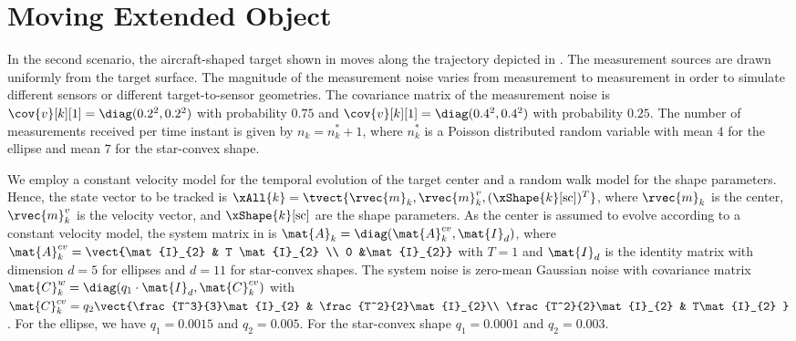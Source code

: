 \documentclass[preprint,1p,11pt]{ISAS_IR}
\newcommand{\placeFig}[1]{}
\begin{document}
\placeFig{5}

\placeFig{6}

\placeFig{7}


 \placeFig{8}




 







 

\section{Moving Extended Object}\label{ssec:eval_ellipse_dyn}
In the second scenario, the aircraft-shaped target  shown in   moves along the trajectory depicted in .
The measurement sources are drawn uniformly from the target surface.
The magnitude of the measurement noise varies from measurement to measurement in order to simulate different sensors or different target-to-sensor geometries.
The covariance matrix of the measurement noise is 
 $\cov{v}[k][1]=\diag(0.2^2,0.2^2)$ with probability $0.75$ and $\cov{v}[k][1]=\diag(0.4^2,0.4^2)$ with probability $0.25$. 
The number of measurements received per time instant is given by  $n_k = n^*_k  + 1 $, where $n^*_k$  is a Poisson distributed random variable  with mean $4$ for the ellipse and mean $7$ for the star-convex shape.




 
We employ a constant velocity model for the temporal evolution of the target center \cite{Bar-Shalom2002} and
a random walk model for the shape parameters.
Hence, the state vector to be tracked is $\xAll{k}=\tvect{ \rvec{m}_k , \rvec{m}^v_k ,    {(\xShape{k}[\text{sc}])^T} }$, where  $\rvec{m}_k$ is the center,  $ \rvec{m}^v_k $ is the velocity vector, and $\xShape{k}[\text{sc}]$ are the shape parameters.
As the center is assumed to evolve according to a constant velocity model, the  system matrix  in  is 
 $\mat{A}_k= \diag(\mat{A}^{cv}_k, \mat{I}_d  )$, where  $\mat{A}^{cv}_k=  \vect{\mat{I}_{2} & T \mat{I}_{2} \\   0 &\mat{I}_{2}}$  with $T=1$ and $\mat{I}_d$ is the identity matrix with dimension $d=5$ for ellipses and $d=11$ for star-convex shapes.
The system noise is zero-mean Gaussian noise with covariance matrix
$\mat{C}_k^{w}=\diag( q_1\cdot \mat{I}_{d}, \mat{C}_k^{cv})$  with 
$\mat{C}_k^{cv}= q_2 \vect{\frac{T^3}{3}\mat{I}_{2} &  \frac{T^2}{2}\mat{I}_{2}\\     \frac{T^2}{2}\mat{I}_{2} & T\mat{I}_{2}  }$.
For the ellipse, we have $q_1=0.0015$ and $q_2=0.005$. For the star-convex shape  $q_1=0.0001$ and $q_2=0.003$. 
\end{document}
